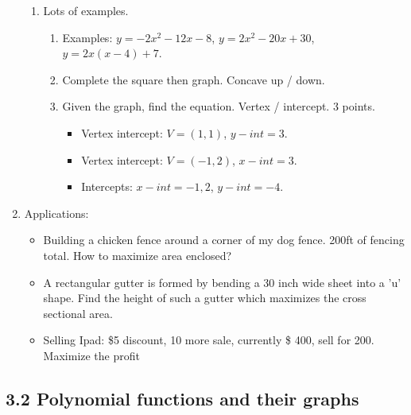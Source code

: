 \documentclass{article}
\begin{document}
\begin{enumerate}
\begin{enumerate}
\item Lots of examples.
\begin{enumerate}
\item Examples: $y=-2x^2-12x-8$, $y=2x^2-20x+30$, $y=2x\left(x-4\right)+7$.
\item Complete the square then graph. Concave up / down.
\item Given the graph, find the equation. Vertex / intercept. 3 points.
\begin{itemize}
\item Vertex intercept: $V=(1,1)$, $y-int = 3$.
\item Vertex intercept: $V=(-1,2)$, $x-int = 3$.
\item Intercepts: $x-int = -1,2$, $y-int=-4$.
\end{itemize}
\end{enumerate}
\end{enumerate}

\item Applications: 
\begin{itemize}
\item Building a chicken fence around a corner of my dog fence. 200ft of fencing total. How to maximize area enclosed?
\item A rectangular gutter is formed by bending a 30 inch wide sheet into a 'u' shape. Find the height of such a gutter which maximizes the cross sectional area.
\item Selling Ipad: \$5 discount, 10 more sale, currently \$ 400, sell for 200. Maximize the profit
\end{itemize}
\end{enumerate}


\subsection{3.2 Polynomial functions and their graphs}
\end{document}
